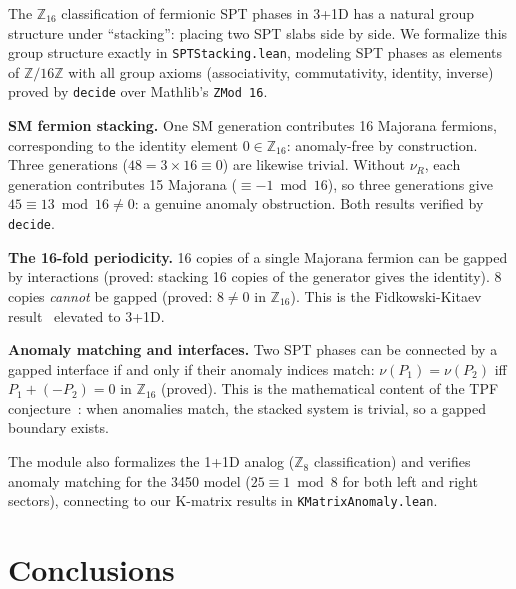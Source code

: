 \documentclass[aps,prl,twocolumn,superscriptaddress]{revtex4-2}
\newcommand{\lean}[1]{\texttt{#1}}
\begin{document}
The $\mathbb{Z}_{16}$ classification of fermionic SPT phases in 3+1D
has a natural group structure under ``stacking'': placing two SPT slabs
side by side. We formalize this group structure exactly in
\lean{SPTStacking.lean}, modeling SPT phases as elements of
$\mathbb{Z}/16\mathbb{Z}$ with all group axioms (associativity,
commutativity, identity, inverse) proved by \texttt{decide} over
Mathlib's \lean{ZMod 16}.

\textbf{SM fermion stacking.} One SM generation contributes 16
Majorana fermions, corresponding to the identity element $0 \in
\mathbb{Z}_{16}$: anomaly-free by construction. Three generations
($48 = 3 \times 16 \equiv 0$) are likewise trivial. Without $\nu_R$,
each generation contributes 15 Majorana ($\equiv -1 \bmod 16$), so
three generations give $45 \equiv 13 \bmod 16 \neq 0$: a genuine
anomaly obstruction. Both results verified by \texttt{decide}.

\textbf{The 16-fold periodicity.} 16 copies of a single Majorana
fermion can be gapped by interactions (proved: stacking 16 copies of
the generator gives the identity). 8 copies \emph{cannot} be gapped
(proved: $8 \neq 0$ in $\mathbb{Z}_{16}$). This is the
Fidkowski-Kitaev result~\cite{fidkowski2010} elevated to 3+1D.

\textbf{Anomaly matching and interfaces.} Two SPT phases can be
connected by a gapped interface if and only if their anomaly indices
match: $\nu(P_1) = \nu(P_2)$ iff $P_1 + (-P_2) = 0$ in
$\mathbb{Z}_{16}$ (proved). This is the mathematical content of the
TPF conjecture~\cite{tpf2026}: when anomalies match, the stacked
system is trivial, so a gapped boundary exists.

The module also formalizes the 1+1D analog ($\mathbb{Z}_8$
classification) and verifies anomaly matching for the 3450 model
($25 \equiv 1 \bmod 8$ for both left and right sectors), connecting
to our K-matrix results in \lean{KMatrixAnomaly.lean}.

\section{Conclusions}
\end{document}
